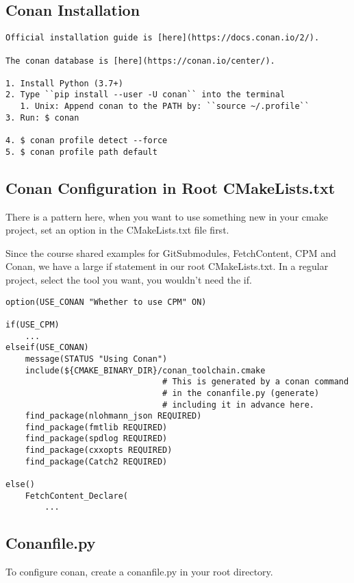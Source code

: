 \documentclass[openany]{report}
\begin{document}
\subsection{Conan Installation}

\begin{verbatim}
Official installation guide is [here](https://docs.conan.io/2/).

The conan database is [here](https://conan.io/center/).

1. Install Python (3.7+)
2. Type ``pip install --user -U conan`` into the terminal
   1. Unix: Append conan to the PATH by: ``source ~/.profile``
3. Run: $ conan

4. $ conan profile detect --force
5. $ conan profile path default
\end{verbatim}


\subsection{Conan Configuration in Root CMakeLists.txt}

There is a pattern here, when you want to use something new in your cmake project,
set an option in the CMakeLists.txt file first.

Since the course shared examples for GitSubmodules, FetchContent, CPM and Conan,
we have a large if statement in our root CMakeLists.txt. In a regular project, 
select the tool you want, you wouldn't need the if.

\begin{verbatim}
option(USE_CONAN "Whether to use CPM" ON)

if(USE_CPM)
    ...
elseif(USE_CONAN)
    message(STATUS "Using Conan")
    include(${CMAKE_BINARY_DIR}/conan_toolchain.cmake  
                                # This is generated by a conan command
                                # in the conanfile.py (generate)
                                # including it in advance here.
    find_package(nlohmann_json REQUIRED)
    find_package(fmtlib REQUIRED)
    find_package(spdlog REQUIRED)
    find_package(cxxopts REQUIRED)
    find_package(Catch2 REQUIRED)

else()
    FetchContent_Declare(
        ...
\end{verbatim}

\subsection{Conanfile.py}

To configure conan, create a conanfile.py in your root directory.
\end{document}
